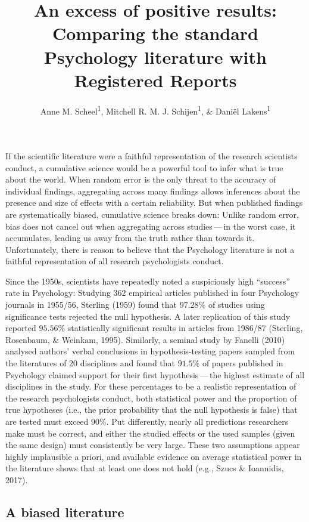 \documentclass[british,,jou,floatsintext]{apa6}
\author{Anne M. Scheel\textsuperscript{1}, Mitchell R. M. J. Schijen\textsuperscript{1}, \& Daniël Lakens\textsuperscript{1}}
\affiliation{
\vspace{0.5cm}
\textsuperscript{1} Eindhoven University of Technology}
\title{An excess of positive results: Comparing the standard Psychology literature with Registered Reports}
\date{}
\begin{document}
\maketitle

If the scientific literature were a faithful representation of the research scientists conduct, a cumulative science would be a powerful tool to infer what is true about the world.
When random error is the only threat to the accuracy of individual findings, aggregating across many findings allows inferences about the presence and size of effects with a certain reliability.
But when published findings are systematically biased, cumulative science breaks down:
Unlike random error, bias does not cancel out when aggregating across studies\(\,\)---\(\,\)in the worst case, it accumulates, leading us away from the truth rather than towards it.
Unfortunately, there is reason to believe that the Psychology literature is not a faithful representation of all research psychologists conduct.

Since the 1950s, scientists have repeatedly noted a suspiciously high \enquote{success} rate in Psychology:
Studying 362 empirical articles published in four Psychology journals in 1955/56, Sterling (1959) found that \(97.28\%\) of studies using significance tests rejected the null hypothesis.
A later replication of this study reported \(95.56\%\) statistically significant results in articles from 1986/87 (Sterling, Rosenbaum, \& Weinkam, 1995).
Similarly, a seminal study by Fanelli (2010) analysed authors' verbal conclusions in hypothesis-testing papers sampled from the literatures of 20 disciplines and found that \(91.5\%\) of papers published in Psychology claimed support for their first hypothesis\(\,\)---\(\,\)the highest estimate of all disciplines in the study.
For these percentages to be a realistic representation of the research psychologists conduct, both statistical power and the proportion of true hypotheses (i.e., the prior probability that the null hypothesis is false) that are tested must exceed \(90\%\).
Put differently, nearly all predictions researchers make must be correct, and either the studied effects or the used samples (given the same design) must consistently be very large.
These two assumptions appear highly implausible a priori, and available evidence on average statistical power in the literature shows that at least one does not hold (e.g., Szucs \& Ioannidis, 2017).

\hypertarget{a-biased-literature}{%
\subsection{A biased literature}\label{a-biased-literature}}
\end{document}
